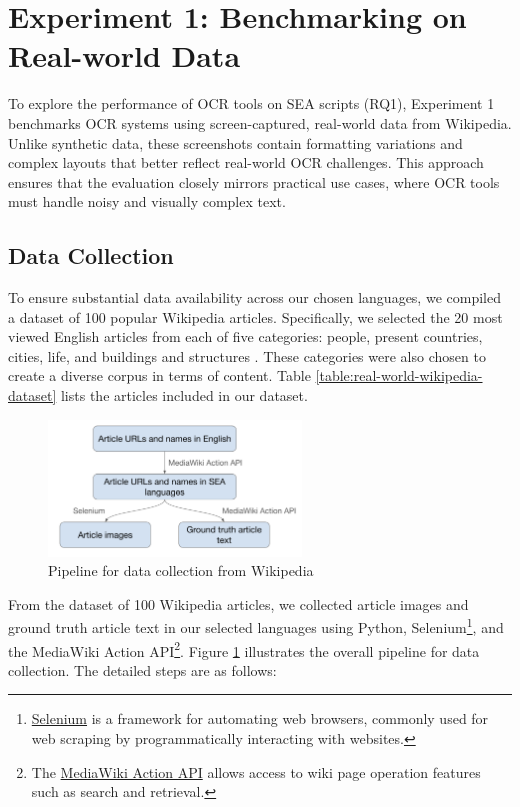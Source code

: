 \documentclass[12pt,oneside]{memoir}
\begin{document}
\section{Experiment 1: Benchmarking on Real-world Data} \label{section:experiment-1}

To explore the performance of OCR tools on SEA scripts (RQ1), Experiment 1 benchmarks OCR systems using screen-captured, real-world data from Wikipedia.
Unlike synthetic data, these screenshots contain formatting variations and complex layouts that better reflect real-world OCR challenges. 
This approach ensures that the evaluation closely mirrors practical use cases, where OCR tools must handle noisy and visually complex text.

\subsection{Data Collection}

To ensure substantial data availability across our chosen languages, we compiled a dataset of 100 popular Wikipedia articles. Specifically, we selected the 20 most viewed English articles from each of five categories: people, present countries, cities, life, and buildings and structures \parencite{wikipedia-popular-pages-2024}.
These categories were also chosen to create a diverse corpus in terms of content. 
Table \ref{table:real-world-wikipedia-dataset} lists the articles included in our dataset.

\begin{figure}[ht]
    \centering
    \includegraphics[width=0.6\textwidth]{images/data-collection.png}
    \caption{Pipeline for data collection from Wikipedia}
    \label{figure:data-collection}
\end{figure}

From the dataset of 100 Wikipedia articles, we collected article images and ground 
truth article text in our selected languages using Python, 
Selenium\footnote{\href{https://selenium-python.readthedocs.io}{Selenium} is a 
framework for automating web browsers, commonly used for web scraping by programmatically 
interacting with websites.}, and the MediaWiki Action API\footnote{The \href{https://www.mediawiki.org/wiki/API:Main_page}{MediaWiki Action API} allows 
access to wiki page operation features such as search and retrieval.}. Figure \ref{figure:data-collection} illustrates the overall pipeline 
for data collection. The detailed steps are as follows:
\end{document}
